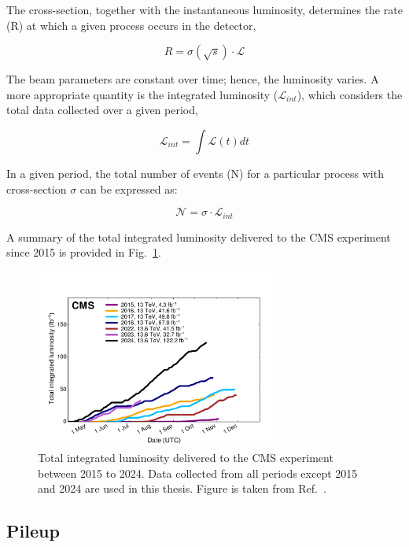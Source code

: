 The cross-section, together with the instantaneous luminosity, determines the rate (R) at which a given process occurs in the detector,

\begin{equation}
    R = \sigma(\sqrt{s}) \cdot \mathscr{L} 
\end{equation}

The beam parameters are constant over time; hence, the luminosity varies. A more appropriate quantity is the integrated luminosity ($\mathscr{L}_{int}$), which considers the total data collected over a given period,

\begin{equation}
    \mathscr{L}_{int} = \int \mathscr{L}(t) dt
\end{equation}

In a given period, the total number of events (N) for a particular process with cross-section $\sigma$ can be expressed as:

\begin{equation}
    \mathscr{N} = \sigma \cdot \mathscr{L}_{int}
\end{equation}

A summary of the total integrated luminosity delivered to the CMS experiment since 2015 is provided in Fig.~\ref{Figure:Chapter3_CMS_IntegratedLumi}.

\begin{figure}[h]
\centering
\includegraphics[width= 0.7\textwidth]{Figures/Chapter3/CMS_IntegratedLumi.pdf}
\caption{Total integrated luminosity delivered to the CMS experiment between 2015 to 2024. Data collected from all periods except 2015 and 2024 are used in this thesis. Figure is taken from Ref.~\cite{CMS_IntegratedLumi}.}
\label{Figure:Chapter3_CMS_IntegratedLumi}
\end{figure}

\subsection{Pileup}


